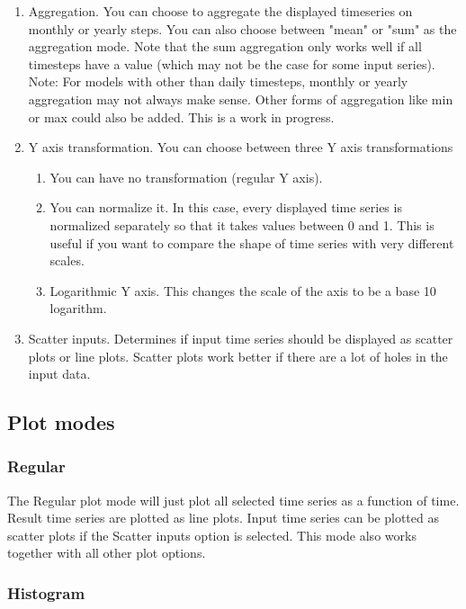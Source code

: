 \documentclass[11pt]{article}
\theoremstyle{definition}
\begin{document}
\begin{enumerate}[i]
\item Aggregation. You can choose to aggregate the displayed timeseries on monthly or yearly steps. You can also choose between "mean" or "sum" as the aggregation mode. Note that the sum aggregation only works well if all timesteps have a value (which may not be the case for some input series). Note: For models with other than daily timesteps, monthly or yearly aggregation may not always make sense. Other forms of aggregation like min or max could also be added. This is a work in progress.
\item Y axis transformation. You can choose between three Y axis transformations
\begin{enumerate}
\item You can have no transformation (regular Y axis).
\item You can normalize it. In this case, every displayed time series is normalized separately so that it takes values between 0 and 1. This is useful if you want to compare the shape of time series with very different scales.
\item Logarithmic Y axis. This changes the scale of the axis to be a base 10 logarithm.
\end{enumerate}
\item Scatter inputs. Determines if input time series should be displayed as scatter plots or line plots. Scatter plots work better if there are a lot of holes in the input data.
\end{enumerate}

\subsection{Plot modes}

\subsubsection{Regular}

The Regular plot mode will just plot all selected time series as a function of time. Result time series are plotted as line plots. Input time series can be plotted as scatter plots if the Scatter inputs option is selected. This mode also works together with all other plot options.

\subsubsection{Histogram}
\end{document}
